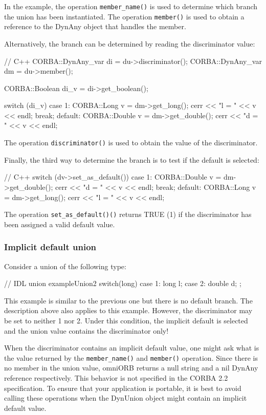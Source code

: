 \documentclass[11pt,twoside,a4paper]{book}
\newcommand{\op}[1]{\texttt{#1()}}
\begin{document}
In the example, the operation \op{member\_name} is used to determine
which branch the union has been instantiated. The operation
\op{member} is used to obtain a reference to the DynAny object that
handles the member.

Alternatively, the branch can be determined by reading the
discriminator value:

\begin{cxxlisting}
// C++
CORBA::DynAny_var di = du->discriminator();
CORBA::DynAny_var dm = du->member();
  
CORBA::Boolean di_v = di->get_boolean();
  
switch (di_v) {
case 1:
  CORBA::Long v = dm->get_long();
  cerr << "l = " << v << endl;
  break;
default:
  CORBA::Double v = dm->get_double();
  cerr << "d = " << v << endl;
}
\end{cxxlisting}

The operation \op{discriminator} is used to obtain the value of the
discriminator.

Finally, the third way to determine the branch is to test if the
default is selected:

\begin{cxxlisting}
// C++
switch (dv->set_as_default()) {
case 1:
  CORBA::Double v = dm->get_double();
  cerr << "d = " << v << endl;
  break;
default:
  CORBA::Long v = dm->get_long();
  cerr << "l = " << v << endl;
}
\end{cxxlisting}

The operation \op{set\_as\_default()} returns TRUE (1) if the
discriminator has been assigned a valid default value.


\subsubsection{Implicit default union}

Consider a union of the following type:

\begin{idllisting}
// IDL
union exampleUnion2 switch(long) {
case 1: long l;
case 2: double d; 
};
\end{idllisting}

This example is similar to the previous one but there is no default
branch.  The description above also applies to this example. However,
the discriminator may be set to neither 1 nor 2. Under this condition,
the implicit default is selected and the union value contains the
discriminator only!

When the discriminator contains an implicit default value, one might
ask what is the value returned by the \op{member\_name} and
\op{member} operation. Since there is no member in the union value,
omniORB returns a null string and a nil DynAny reference respectively.
This behavior is not specified in the CORBA 2.2 specification. To
ensure that your application is portable, it is best to avoid calling
these operations when the DynUnion object might contain an implicit
default value.
\end{document}

